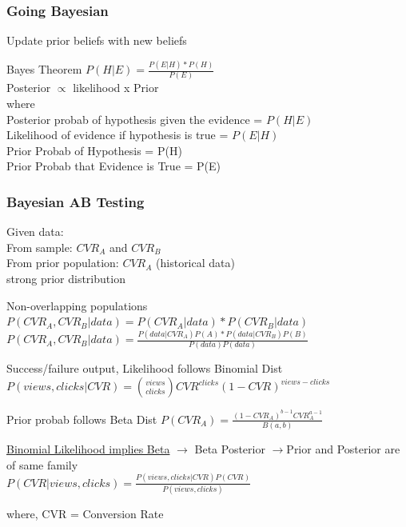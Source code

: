 \documentclass{beamer}
\begin{document}
\begin{frame}\frametitle{Going Bayesian}
	Update prior beliefs with new beliefs\\
	\begin{exampleblock}{Bayes Theorem}
	$P(H|E) = \frac{P(E|H) * P(H)}{P(E)}$\\
	Posterior $\propto$ likelihood x Prior\\
	where\\
	Posterior probab of hypothesis given the evidence = $P(H|E)$\\ 
	Likelihood of evidence if hypothesis is true = $P(E|H)$\\
	Prior Probab of Hypothesis  = P(H) \\
	Prior Probab that Evidence is True = P(E)
	\end{exampleblock}
	
\end{frame}

\begin{frame}[allowframebreaks]\frametitle{Bayesian AB Testing}
	Given data:\\
	From sample: $CVR_A$ and $CVR_B$\\
	From prior population: $CVR_A$ (historical data)\\
	strong prior distribution\\

	\begin{exampleblock}{Non-overlapping populations}
		$P(CVR_A,CVR_B | data) = P(CVR_A|data) * P(CVR_B|data)$\\
		$P(CVR_A,CVR_B | data) = \frac{P(data|CVR_A)P(A) * P(data|CVR_B)P(B)}{P(data){P(data)}}$
	\end{exampleblock}
	
	\begin{exampleblock}{Success/failure output, Likelihood  follows Binomial Dist}
		$P(views, clicks | CVR) = {views \choose clicks} CVR^{clicks} (1-CVR)^{views-clicks}$
	\end{exampleblock}
	
	\begin{exampleblock}{Prior probab follows Beta Dist}
		$P(CVR_A) = \frac{(1-CVR_A)^{b-1} CVR_A^{a-1}}{B(a,b)}$
	\end{exampleblock}
	
	\begin{exampleblock}{\hyperlink{betabino}{Binomial Likelihood implies  Beta}}
		$\rightarrow$ Beta Posterior $\rightarrow$Prior and Posterior are of same family\\
		$P(CVR|views, clicks) = \frac{P(views, clicks|CVR) P(CVR)}{P(views, clicks)}$
	\end{exampleblock}

	where, CVR = Conversion Rate
	
\end{frame}
\end{document}
